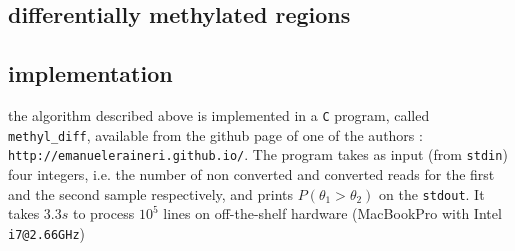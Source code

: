 \documentclass[11pt]{amsart}
\begin{document}
\subsection{differentially methylated regions}
\subsection{implementation}
the algorithm described above is implemented in a \verb=C= program, called \verb=methyl_diff=, available from the github page of one of the authors : \verb=http://emanueleraineri.github.io/=. The program takes as input (from \verb=stdin=) four integers, i.e. the number of non converted and converted reads for the first and the second sample respectively, and prints $P(\theta_1>\theta_2)$ on the \verb=stdout=. It takes $3.3s$ to process $10^5$ lines on off-the-shelf hardware (MacBookPro with Intel \verb=i7@2.66GHz=) 


\end{document}
